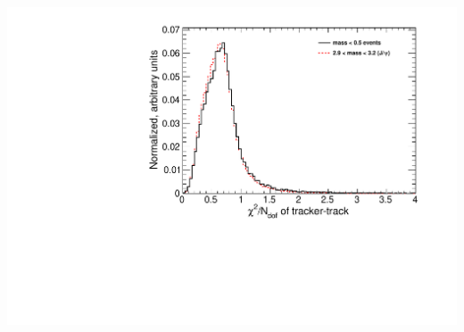 \documentclass[compress]{beamer}
\begin{document}
\begin{frame}
\begin{columns}
\includegraphics[width=\linewidth]{lowmassquality_normchi2.pdf}
\end{columns}
\end{frame}
\end{document}
